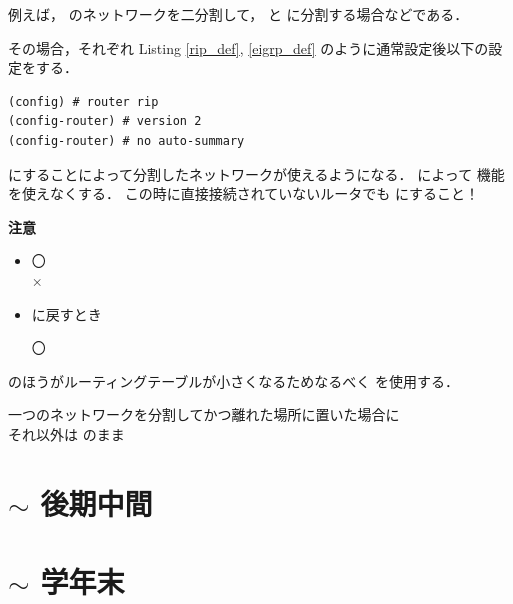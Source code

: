 \documentclass[uplatex,dvipdfmx]{bxjsarticle}
\begin{document}
例えば， のネットワークを二分割して， と  に分割する場合などである．

その場合，それぞれ Listing \ref{rip_def}, \ref{eigrp_def} のように通常設定後以下の設定をする．

\begin{lstlisting}
(config) # router rip
(config-router) # version 2
(config-router) # no auto-summary
\end{lstlisting}

 にすることによって分割したネットワークが使えるようになる．
によって  機能を使えなくする．
この時に直接接続されていないルータでも  にすること！

\textbf{注意}\\
\begin{itemize}
  \item {}
  \begin{description}
    \item[〇] 
    \item[×]  
  \end{description}
  \item {} に戻すとき
  \begin{description}
    \item[〇] 
  \end{description}
\end{itemize}

 のほうがルーティングテーブルが小さくなるためなるべく  を使用する．\\

\begin{tcolorbox}[title=Point,colback=yellow!10,colframe=black,boxrule=0.8pt,arc=2mm]
一つのネットワークを分割してかつ離れた場所に置いた場合に  \\
それ以外は  のまま
\end{tcolorbox}




\section{$\sim$ 後期中間}
\section{$\sim$ 学年末}
\end{document}
